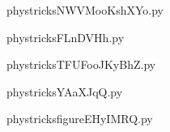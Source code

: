     

    \clearpage
    


    \newcommand{\CaptionFigNWVMooKshXYo}{<+Type your caption here+>}
    \begin{center}
        
    \end{center}
    phystricksNWVMooKshXYo.py

    

    \clearpage
    


    \newcommand{\CaptionFigFLnDVHh}{<+Type your caption here+>}
    \begin{center}
        
    \end{center}
    phystricksFLnDVHh.py

    

    \clearpage
    


    \newcommand{\CaptionFigTFUFooJKyBhZ}{<+Type your caption here+>}
    \begin{center}
        
    \end{center}
    phystricksTFUFooJKyBhZ.py

    

    \clearpage
    


    \newcommand{\CaptionFigYAaXJqQ}{<+Type your caption here+>}
    \begin{center}
        
    \end{center}
    phystricksYAaXJqQ.py

    

    \clearpage
    


    \newcommand{\CaptionFigfigureEHyIMRQ}{<+Type your caption here+>}
    \begin{center}
        
    \end{center}
    phystricksfigureEHyIMRQ.py

    

    \clearpage
    



